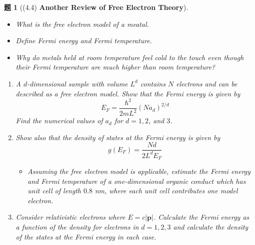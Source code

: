 \documentclass[UTF8,10pt,a4paper]{article}
\theoremstyle{Problem}
\newtheorem{prob}{题}
\theoremstyle{Solution}
\providecommand{\abs}[1]{\left\lvert#1\right\rvert}
\begin{document}
\begin{prob}[(4.4) \textbf{Another Review of Free Electron Theory}]
    \begin{itemize}
        \item[$\triangleright$] What is the \textit{free electron model} of a meatal.
        \item[$\triangleright$] Define \textit{Fermi energy} and \textit{Fermi temperature}.
        \item[$\triangleright$] Why do metals held at room temperature feel cold to the touch even though their Fermi temperature are much higher than room temperature?
    \end{itemize}
    \begin{enumerate}
        \item[(a)] A $d$-dimensional sample with volume $L^d$ contains $N$ electrons and can be described as a free electron model. Show that the Fermi energy is given by
        \[
            E_F=\frac{\hbar^2}{2mL^2}(Na_d)^{2/d}
        \]
        Find the numerical values of $a_d$ for $d=1,2$, and $3$.
        \item[(b)] Show also that the density of states at the Fermi energy is given by
        \[
            g(E_F)=\frac{Nd}{2L^dE_F}
        \]
        \begin{itemize}
            \item[$\triangleright$] Assuming the free electron model is applicable, estimate the Fermi energy and Fermi temperature of a one-dimensional organic conduct which has unit cell of length $0.8$ nm, where each unit cell contributes one model electron.
        \end{itemize}
        \item[(c)] Consider relativistic electrons where $E=c\abs{\bm{p}}$. Calculate the Fermi energy as a function of the density for electrons in $d=1,2,3$ and calculate the density of the states at the Fermi energy in each case.
    \end{enumerate}
\end{prob}
\end{document}
